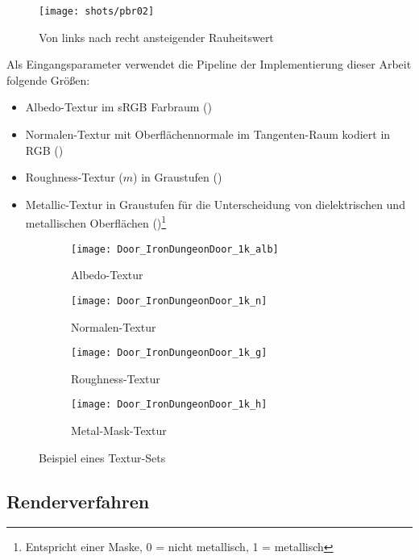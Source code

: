 \begin{figure}
\centering
	\texttt{[image: shots/pbr02]}
	\caption{Von links nach recht ansteigender Rauheitswert}
	\label{fig:pbr-roughness}
\end{figure}

Als Eingangsparameter verwendet die Pipeline der Implementierung dieser Arbeit folgende Größen:
\begin{itemize}
\item Albedo-Textur im sRGB Farbraum ()
\item Normalen-Textur mit Oberflächennormale im Tangenten-Raum kodiert in RGB ()
\item Roughness-Textur ($m$) in Graustufen ()
\item Metallic-Textur in Graustufen für die Unterscheidung von dielektrischen und metallischen Oberflächen ()\footnote{Entspricht einer Maske, 0 = nicht metallisch, 1 = metallisch}
\end{itemize}

\begin{figure}
\centering
\begin{subfigure}{0.24\textwidth}
	\texttt{[image: Door\_IronDungeonDoor\_1k\_alb]}
	\caption{Albedo-Textur}\label{fig:pbr-albedo-tex}
\end{subfigure}
\begin{subfigure}{0.24\textwidth}
	\texttt{[image: Door\_IronDungeonDoor\_1k\_n]}
	\caption{Normalen-Textur}\label{fig:pbr-normale-tex}
\end{subfigure}
\begin{subfigure}{0.24\textwidth}
	\texttt{[image: Door\_IronDungeonDoor\_1k\_g]}
	\caption{Roughness-Textur}\label{fig:pbr-roughness-tex}
\end{subfigure}
\begin{subfigure}{0.24\textwidth}
	\texttt{[image: Door\_IronDungeonDoor\_1k\_h]}
	\caption{Metal-Mask-Textur}\label{fig:pbr-metalmask-tex}
\end{subfigure}
\caption{Beispiel eines Textur-Sets}
\label{fig:pbr-texturen}
\end{figure}


\subsection{Renderverfahren}

